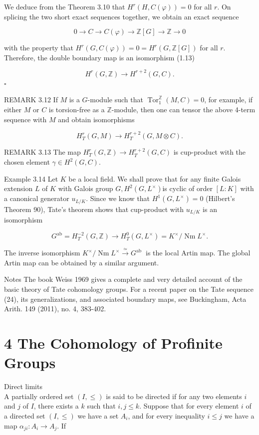 \documentclass[10pt]{article}
\begin{document}
We deduce from the Theorem 3.10 that $H^{r}(H, C(\varphi))=0$ for all $r$. On splicing the two short exact sequences together, we obtain an exact sequence


\begin{equation*}
0 \rightarrow C \rightarrow C(\varphi) \rightarrow \mathbb{Z}[G] \rightarrow \mathbb{Z} \rightarrow 0 \tag{24}
\end{equation*}


with the property that $H^{r}(G, C(\varphi))=0=H^{r}(G, \mathbb{Z}[G])$ for all $r$. Therefore, the double boundary map is an isomorphism (1.13)

$$
H^{r}(G, \mathbb{Z}) \rightarrow H^{r+2}(G, C) .
$$ \(\square\)

REMARK 3.12 If $M$ is a $G$-module such that $\operatorname{Tor}_{1}^{\mathbb{Z}}(M, C)=0$, for example, if either $M$ or $C$ is torsion-free as a $\mathbb{Z}$-module, then one can tensor the above 4-term sequence with $M$ and obtain isomorphisms

$$
H_{T}^{r}(G, M) \rightarrow H_{T}^{r+2}(G, M \otimes C) .
$$

REMARK 3.13 The map $H_{T}^{r}(G, \mathbb{Z}) \rightarrow H_{T}^{r+2}(G, C)$ is cup-product with the chosen element $\gamma \in H^{2}(G, C)$.

Example 3.14 Let $K$ be a local field. We shall prove that for any finite Galois extension $L$ of $K$ with Galois group $G, H^{2}\left(G, L^{\times}\right)$is cyclic of order $[L: K]$ with a canonical generator $u_{L / K}$. Since we know that $H^{1}\left(G, L^{\times}\right)=0$ (Hilbert's Theorem 90), Tate's theorem shows that cup-product with $u_{L / K}$ is an isomorphism

$$
G^{\mathrm{ab}}=H_{T}^{-2}(G, \mathbb{Z}) \rightarrow H_{T}^{0}\left(G, L^{\times}\right)=K^{\times} / \operatorname{Nm} L^{\times} .
$$

The inverse isomorphism $K^{\times} / \operatorname{Nm} L^{\times} \xrightarrow{\simeq} G^{\text {ab }}$ is the local Artin map. The global Artin map can be obtained by a similar argument.

Notes The book Weiss 1969 gives a complete and very detailed account of the basic theory of Tate cohomology groups. For a recent paper on the Tate sequence (24), its generalizations, and associated boundary maps, see Buckingham, Acta Arith. 149 (2011), no. 4, 383-402.

\section*{4 The Cohomology of Profinite Groups}
Direct limits\\
A partially ordered set $(I, \leq)$ is said to be directed if for any two elements $i$ and $j$ of $I$, there exists a $k$ such that $i, j \leq k$. Suppose that for every element $i$ of a directed set $(I, \leq)$ we have a set $A_{i}$, and for every inequality $i \leq j$ we have a map $\alpha_{j i}: A_{i} \rightarrow A_{j}$. If
\end{document}
